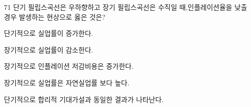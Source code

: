 \begin{question}{71}
단기 필립스곡선은 우하향하고 장기 필립스곡선은 수직일 때,인플레이션율을 낮출 경우 발생하는 현상으로 옳은 것은?
\begin{choices}
  \item 단기적으로 실업률이 증가한다.
  \item 장기적으로 실업률이 감소한다.
  \item 장기적으로 인플레이션 저감비용은 증가한다.
  \item 장기적으로 실업률은 자연실업률 보다 높다.
  \item 단기적으로 합리적 기대가설과 동일한 결과가 나타난다.
\end{choices}
\end{question}
